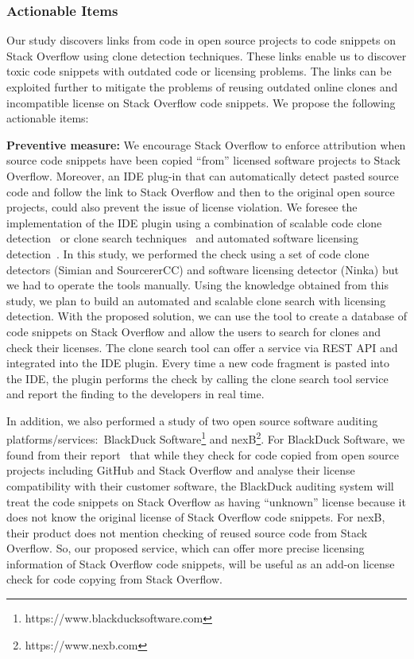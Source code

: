 \documentclass[10pt,journal,compsoc]{IEEEtran}
\begin{document}
\subsubsection{Actionable Items}
Our study discovers links from code in open source projects to code snippets on
Stack Overflow using clone detection techniques. These links enable us to
discover toxic code snippets with outdated code or licensing problems. 
The links can be exploited further to mitigate the problems of reusing outdated online clones and
incompatible license on Stack Overflow code snippets. We propose the following
actionable items: 

\textbf{Preventive measure:} We encourage Stack Overflow to enforce attribution
when source code snippets have been copied ``from'' licensed software projects
to Stack Overflow. Moreover, an IDE plug-in that can automatically detect pasted
source code and follow the link to Stack Overflow and then to the original open
source projects, could also prevent the issue of license violation. We foresee
the implementation of the IDE plugin using a combination of scalable code clone
detection~\cite{Sajnani2016} or clone search techniques~\cite{Kim2018} and
automated software licensing detection~\cite{German2010}. In this study, we
performed the check using a set of code clone detectors (Simian and SourcererCC)
and software licensing detector (Ninka) but we had to operate the tools
manually. Using the knowledge obtained from this study, we plan to build an
automated and scalable clone search with licensing detection. With the proposed
solution, we can use the tool to create a database of code snippets on Stack
Overflow and allow the users to search for clones and check their licenses. The
clone search tool can offer a service via REST API and integrated into the IDE
plugin. Every time a new code fragment is pasted into the IDE, the plugin
performs the check by calling the clone search tool service and report the
finding to the developers in real time.

In addition, we also performed a study of two open source software auditing
platforms/services:~BlackDuck
Software\footnote{https://www.blackducksoftware.com} and
nexB\footnote{https://www.nexb.com}. For BlackDuck Software, we found from their
report~\cite{CORSI2017} that while they check for code copied from open source
projects including GitHub and Stack Overflow and analyse their license
compatibility with their customer software, the BlackDuck auditing system will
treat the code snippets on Stack Overflow as having ``unknown'' license because
it does not know the original license of Stack Overflow code snippets. For nexB,
their product does not mention checking of reused source code from Stack
Overflow. So, our proposed service, which can offer more precise licensing
information of Stack Overflow code snippets, will be useful as an add-on license
check for code copying from Stack Overflow.
	
\end{document}
